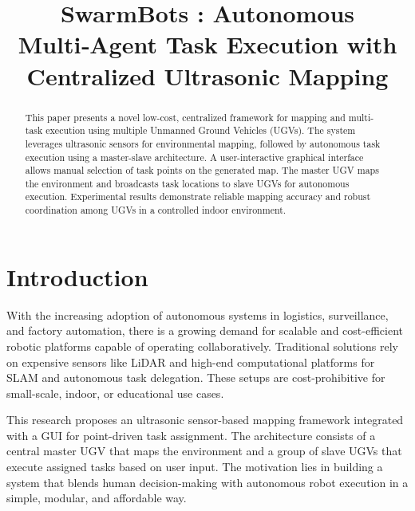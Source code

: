 \documentclass[conference]{IEEEtran}
\begin{document}
\title{SwarmBots : Autonomous Multi‑Agent Task Execution with Centralized Ultrasonic Mapping}
\author{
}
\maketitle

\begin{abstract}
  This paper presents a novel low-cost, centralized framework for mapping and multi-task execution using multiple Unmanned Ground Vehicles (UGVs). The system leverages ultrasonic sensors for environmental mapping, followed by autonomous task execution using a master-slave architecture. A user-interactive graphical interface allows manual selection of task points on the generated map. The master UGV maps the environment and broadcasts task locations to slave UGVs for autonomous execution. Experimental results demonstrate reliable mapping accuracy and robust coordination among UGVs in a controlled indoor environment.
\end{abstract}

\section{Introduction}
\label{sec:intro}
With the increasing adoption of autonomous systems in logistics, surveillance, and factory automation, there is a growing demand for scalable and cost-efficient robotic platforms capable of operating collaboratively. Traditional solutions rely on expensive sensors like LiDAR and high-end computational platforms for SLAM and autonomous task delegation. These setups are cost-prohibitive for small-scale, indoor, or educational use cases.

This research proposes an ultrasonic sensor-based mapping framework integrated with a GUI for point-driven task assignment. The architecture consists of a central master UGV that maps the environment and a group of slave UGVs that execute assigned tasks based on user input. The motivation lies in building a system that blends human decision-making with autonomous robot execution in a simple, modular, and affordable way.
\end{document}
